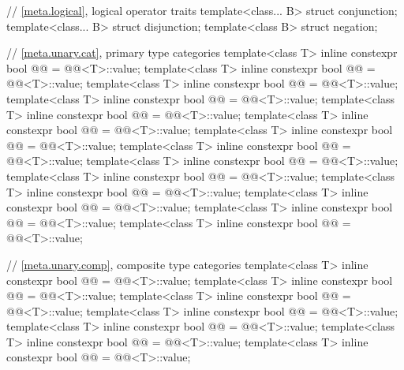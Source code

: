 \begin{codeblock}
{  // \ref{meta.logical}, logical operator traits
  template<class... B> struct conjunction;
  template<class... B> struct disjunction;
  template<class B> struct negation;

  // \ref{meta.unary.cat}, primary type categories
  template<class T>
    inline constexpr bool @@ = @@<T>::value;
  template<class T>
    inline constexpr bool @@ = @@<T>::value;
  template<class T>
    inline constexpr bool @@ = @@<T>::value;
  template<class T>
    inline constexpr bool @@ = @@<T>::value;
  template<class T>
    inline constexpr bool @@ = @@<T>::value;
  template<class T>
    inline constexpr bool @@ = @@<T>::value;
  template<class T>
    inline constexpr bool @@ = @@<T>::value;
  template<class T>
    inline constexpr bool @@ = @@<T>::value;
  template<class T>
    inline constexpr bool @@ = @@<T>::value;
  template<class T>
    inline constexpr bool @@ = @@<T>::value;
  template<class T>
    inline constexpr bool @@ = @@<T>::value;
  template<class T>
    inline constexpr bool @@ = @@<T>::value;
  template<class T>
    inline constexpr bool @@ = @@<T>::value;
  template<class T>
    inline constexpr bool @@ = @@<T>::value;

  // \ref{meta.unary.comp}, composite type categories
  template<class T>
    inline constexpr bool @@ = @@<T>::value;
  template<class T>
    inline constexpr bool @@ = @@<T>::value;
  template<class T>
    inline constexpr bool @@ = @@<T>::value;
  template<class T>
    inline constexpr bool @@ = @@<T>::value;
  template<class T>
    inline constexpr bool @@ = @@<T>::value;
  template<class T>
    inline constexpr bool @@ = @@<T>::value;
  template<class T>
    inline constexpr bool @@ = @@<T>::value;

}
\end{codeblock}
